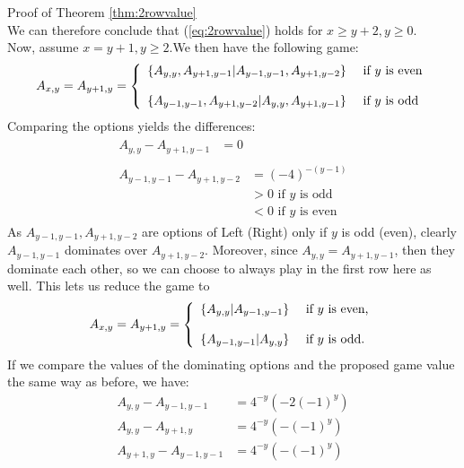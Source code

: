 \begin{proof2}{Proof of Theorem \ref{thm:2rowvalue}}
\\
We can therefore conclude that (\ref{eq:2rowvalue}) holds for $x\ge y+2,y\ge0$. 
\\
Now, assume $x=y+1,y\ge2$.We then have the following game:
\begin{align*}
A_{x,y}=A_{y+1,y}=\left\{
\begin{array}{l l}
\left\{A_{y,y},A_{y+1,y-1}\middle|A_{y-1,y-1},A_{y+1,y-2}\right\}&\text{ if $y$ is even}\\
~\\
\left\{A_{y-1,y-1},A_{y+1,y-2}\middle|A_{y,y},A_{y+1,y-1}\right\}&\text{ if $y$ is odd}
\end{array}\right.
\end{align*} 
Comparing the options yields the differences:
\begin{align*}
\begin{split}
A_{y,y}-A_{y+1,y-1}&=0
\end{split}\\
\begin{split}
A_{y-1,y-1}-A_{y+1,y-2}&=(-4)^{-(y-1)}\\
&>0\text{ if $y$ is odd}\\
&<0\text{ if $y$ is even}
\end{split}
\end{align*}
As $A_{y-1,y-1},A_{y+1,y-2}$ are options of Left (Right) only if $y$ is odd (even), clearly $A_{y-1,y-1}$ dominates over $A_{y+1,y-2}$. Moreover, since $A_{y,y}=A_{y+1,y-1}$, then they dominate each other, so we can choose to always play in the first row here as well. This lets us reduce the game to
\begin{align*}
A_{x,y}=A_{y+1,y}=\left\{
\begin{array}{l l}
\left\{A_{y,y}\middle|A_{y-1,y-1}\right\}&\text{ if $y$ is even,}\\
~\\
\left\{A_{y-1,y-1}\middle|A_{y,y}\right\}&\text{ if $y$ is odd.}
\end{array}\right.
\end{align*}
If we compare the values of the dominating options and the proposed game value the same way as before, we have:
\begin{equation*}
\begin{split}
A_{y,y}-A_{y-1,y-1}&=4^{-y}\left(-2(-1)^y\right)\\
A_{y,y}-A_{y+1,y}&=4^{-y}\left(-(-1)^y\right)\\
A_{y+1,y}-A_{y-1,y-1}&=4^{-y}\left(-(-1)^y\right)
\end{split}

\end{equation*}
\end{proof2}
